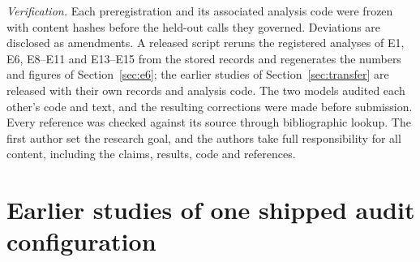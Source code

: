 \documentclass{article}
\begin{document}
\emph{Verification.} Each preregistration and its associated analysis
code were frozen with content hashes before the held-out calls they
governed. Deviations are disclosed as amendments. A released script
reruns the registered analyses of E1, E6, E8--E11 and E13--E15 from the stored records and regenerates the numbers and figures
of Section~\ref{sec:e6}; the earlier studies of Section~\ref{sec:transfer} are released with their own records and
analysis code. The two
models audited each other's code and text, and the resulting corrections
were made before submission. Every reference was checked against its
source through bibliographic lookup. The first author set the research goal,
and the authors take full responsibility for all content, including the claims,
results, code and references.




\newpage
\appendix
\onecolumn

\section{Earlier studies of one shipped audit configuration}
\label{app:earlier}







\end{document}
